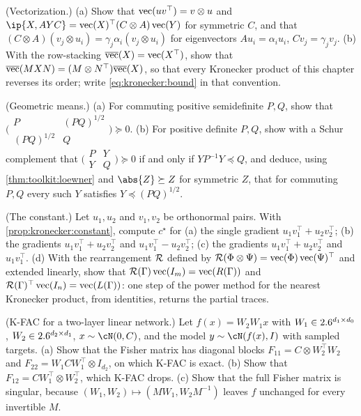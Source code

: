 \begin{refsection}
\begin{exercises}
\item \consolidation (Vectorization.) (a) Show that $\operatorname{vec}(uv^\top)=v\otimes u$ and $\ip{X,AYC}=\vect(X)^\top(C\otimes A)\vect(Y)$ for symmetric $C$, and that $(C\otimes A)(v_j\otimes u_i)=\gamma_j\alpha_i(v_j\otimes u_i)$ for eigenvectors $Au_i=\alpha_iu_i$, $Cv_j=\gamma_jv_j$. (b) With the row-stacking $\overline{\operatorname{vec}}(X)=\operatorname{vec}(X^\top)$, show that $\overline{\operatorname{vec}}(MXN)=(M\otimes N^\top)\overline{\operatorname{vec}}(X)$, so that every Kronecker product of this chapter reverses its order; write \eqref{eq:kronecker:bound} in that convention.\label{ex:kronecker:vec}

\item \consolidation (Geometric means.) (a) For commuting positive semidefinite $P,Q$, show that $\bigl(\begin{smallmatrix}P&(PQ)^{1/2}\\(PQ)^{1/2}&Q\end{smallmatrix}\bigr)\succeq0$. (b) For positive definite $P,Q$, show with a Schur complement that $\bigl(\begin{smallmatrix}P&Y\\Y&Q\end{smallmatrix}\bigr)\succeq0$ if and only if $YP^{-1}Y\preceq Q$, and deduce, using \cref{thm:toolkit:loewner} and $\abs{Z}\succeq Z$ for symmetric $Z$, that for commuting $P,Q$ every such $Y$ satisfies $Y\preceq(PQ)^{1/2}$.\label{ex:kronecker:geomean}

\item \consolidation (The constant.) Let $u_1,u_2$ and $v_1,v_2$ be orthonormal pairs. With \cref{prop:kronecker:constant}, compute $c^\star$ for (a) the single gradient $u_1v_1^\top+u_2v_2^\top$; (b) the gradients $u_1v_1^\top+u_2v_2^\top$ and $u_1v_1^\top-u_2v_2^\top$; (c) the gradients $u_1v_1^\top+u_2v_2^\top$ and $u_1v_1^\top$. (d) With the rearrangement $\mathcal{R}$ defined by $\mathcal{R}(\Phi\otimes\Psi)=\operatorname{vec}(\Phi)\operatorname{vec}(\Psi)^\top$ and extended linearly, show that $\mathcal{R}(\Gamma)\operatorname{vec}(I_m)=\operatorname{vec}(R(\Gamma))$ and $\mathcal{R}(\Gamma)^\top\operatorname{vec}(I_n)=\operatorname{vec}(L(\Gamma))$: one step of the power method for the nearest Kronecker product, from identities, returns the partial traces. \label{ex:kronecker:constant}

\item \consolidation (K-FAC for a two-layer linear network.) Let $f(x)=W_2W_1x$ with $W_1\in2.6^{d_1\times d_0}$, $W_2\in2.6^{d_2\times d_1}$, $x\sim\cN(0,C)$, and the model $y\sim\cN(f(x),I)$ with sampled targets. (a) Show that the Fisher matrix has diagonal blocks $F_{11}=C\otimes W_2^\top W_2$ and $F_{22}=W_1CW_1^\top\otimes I_{d_2}$, on which K-FAC is exact. (b) Show that $F_{12}=CW_1^\top\otimes W_2^\top$, which K-FAC drops. (c) Show that the full Fisher matrix is singular, because $(W_1,W_2)\mapsto(MW_1,W_2M^{-1})$ leaves $f$ unchanged for every invertible $M$.\label{ex:kronecker:twolayer}


\end{exercises}
\end{refsection}
